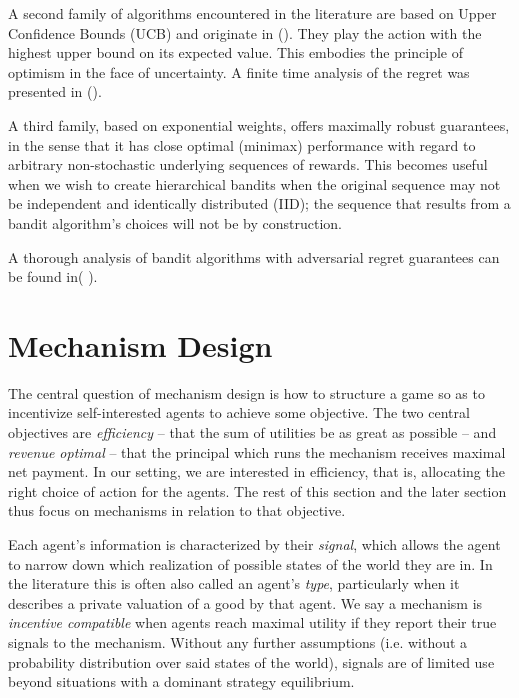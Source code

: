 A second family of algorithms encountered in the literature are based on Upper Confidence Bounds (UCB) and originate in (\cite{lai:85,katehakis1995sequential,agrawal1995sample}). They play the action with the highest upper bound on its expected value. This embodies the principle of optimism in the face of uncertainty. A finite time analysis of the regret was presented in (\cite{auer:02a}).

A third family, based on exponential weights, offers maximally robust guarantees, in the sense that it has close optimal (minimax) performance with regard to arbitrary non-stochastic underlying sequences of rewards. This becomes useful when we wish to create hierarchical bandits when the original sequence may not be independent and identically distributed (IID); the sequence that results from a bandit algorithm's choices will not be by construction.

A thorough analysis of bandit algorithms with adversarial regret guarantees can be found in( \cite{bubeck:12, banditalgo2016}). 

\section{Mechanism Design}

The central question of mechanism design is how to structure a game so as to incentivize self-interested agents to achieve some objective.
The two central objectives are \emph{efficiency} -- that the sum of utilities be as great as possible -- and \emph{revenue optimal} -- that the principal which runs the mechanism receives maximal net payment.
In our setting, we are interested in efficiency, that is, allocating the right choice of action for the agents. The rest of this section and the later section thus focus on mechanisms in relation to that objective.

Each agent's information is characterized by their \emph{signal}, which allows the agent to narrow down which realization of possible states of the world they are in. In the literature this is often also called an agent's \emph{type}, particularly when it describes a private valuation of a good by that agent.
We say a mechanism is \emph{incentive compatible} when agents reach maximal utility if they report their true signals to the mechanism. 
Without any further assumptions (i.e. without a probability distribution over said states of the world), signals are of limited use beyond situations with a dominant strategy equilibrium.

